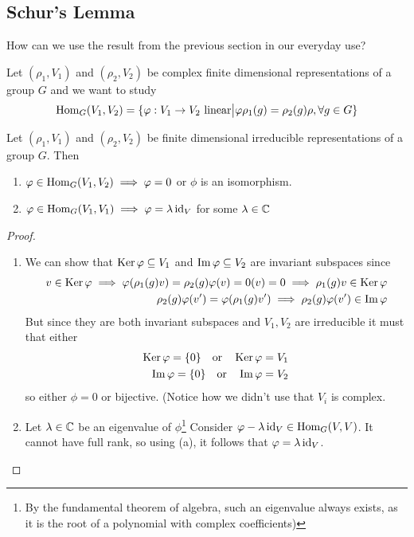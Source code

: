 \subsection{Schur's Lemma}
How can we use the result from the previous section in our everyday use?

Let $(\rho_1,V_1)$ and $(\rho_2,V_2)$ be complex finite dimensional representations of a group $G$ and we want to study
\begin{align*}
  \operatorname{Hom}_G(V_1,V_2) = \{\varphi: V_1 \to V_2 \text{ linear}\big\vert \varphi \rho_1(g) = \rho_2(g) \rho, \forall g \in G\}
\end{align*}
\begin{thm}
  Let $(\rho_1,V_1)$ and $(\rho_2,V_2)$ be finite dimensional irreducible representations of a group $G$. Then
  \begin{enumerate}
    \item $\varphi \in \operatorname{Hom}_G(V_1,V_2) \implies \varphi = 0$ or $\phi$ is an isomorphism.
    \item $\varphi \in \operatorname{Hom}_G(V_1,V_1) \implies \varphi = \lambda \operatorname{id}_V$ for some $\lambda \in \mathbb{C}$
  \end{enumerate}
\end{thm}
\begin{proof}
\begin{enumerate}
  \item We can show that $\operatorname{Ker} \varphi \subseteq V_1$ and $\operatorname{Im} \varphi \subseteq V_2$ are invariant subspaces since
    \begin{align*}
      v \in \operatorname{Ker} \varphi \implies \varphi(\rho_1(g)v) = \rho_2(g)\varphi(v) = 0(v) = 0 \implies \rho_1(g)v \in \operatorname{Ker} \varphi\\
      \rho_2(g) \varphi(v')= \varphi(\rho_1(g)v') \implies \rho_2(g) \varphi(v') \in \operatorname{Im} \varphi
    \end{align*}
    But since they are both invariant subspaces and $V_1,V_2$ are irreducible it must that either
    \begin{align*}
      \operatorname{Ker} \varphi = \{0\} \quad \text{or} \quad \operatorname{Ker} \varphi = V_1\\
      \operatorname{Im} \varphi = \{0\} \quad \text{or} \quad \operatorname{Im} \varphi = V_2
    \end{align*}
    so either $\phi = 0$ or bijective. 
    (Notice how we didn't use that $V_i$ is complex.
  \item Let $\lambda \in \mathbb{C}$ be an eigenvalue of $\phi$\footnote{
      By the fundamental theorem of algebra, such an eigenvalue always exists, as it is the root of a polynomial with complex coefficients)
    }
    Consider $\varphi - \lambda \operatorname{id}_{V} \in \operatorname{Hom}_G(V,V)$. It cannot have full rank, so using (a), it follows that $\varphi = \lambda \operatorname{id}_{V}$.
\end{enumerate}
\end{proof}

